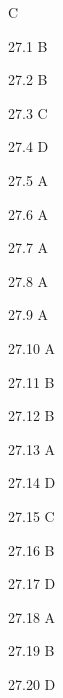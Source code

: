 \begin{Solution}{27}
C
\end{Solution}
\begin{Solution}{27.{1}}
B
\end{Solution}
\begin{Solution}{27.{2}}
B
\end{Solution}
\begin{Solution}{27.{3}}
C
\end{Solution}
\begin{Solution}{27.{4}}
D
\end{Solution}
\begin{Solution}{27.{5}}
A
\end{Solution}
\begin{Solution}{27.{6}}
A
\end{Solution}
\begin{Solution}{27.{7}}
A
\end{Solution}
\begin{Solution}{27.{8}}
A
\end{Solution}
\begin{Solution}{27.{9}}
A
\end{Solution}
\begin{Solution}{27.{10}}
A
\end{Solution}
\begin{Solution}{27.{11}}
B
\end{Solution}
\begin{Solution}{27.{12}}
B
\end{Solution}
\begin{Solution}{27.{13}}
A
\end{Solution}
\begin{Solution}{27.{14}}
D
\end{Solution}
\begin{Solution}{27.{15}}
C
\end{Solution}
\begin{Solution}{27.{16}}
B
\end{Solution}
\begin{Solution}{27.{17}}
D
\end{Solution}
\begin{Solution}{27.{18}}
A
\end{Solution}
\begin{Solution}{27.{19}}
B
\end{Solution}
\begin{Solution}{27.{20}}
D
\end{Solution}

